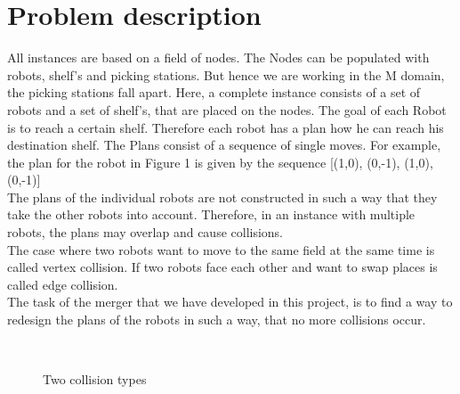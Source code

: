 \documentclass{llncs}
\begin{document}
\newpage

\section{Problem description}
All instances are based on a field of nodes. The Nodes can be populated with robots, shelf's and picking stations. But hence we are working in the M domain, the picking stations fall apart.
Here, a complete instance consists of a set of robots and a set of shelf's, that are placed on the nodes. The goal of each Robot is to reach a certain shelf. Therefore each robot has a plan how he can reach his destination shelf. The Plans consist of a sequence of single moves. For example, the plan for the robot in Figure 1 is given by the sequence [(1,0), (0,-1), (1,0), (0,-1)]\\
The plans of the individual robots are not constructed in such a way that they take the other robots into account. Therefore, in an instance with multiple robots, the plans may overlap and cause collisions.\\
The case where two robots want to move to the same field at the same time is called vertex collision. If two robots face each other and want to swap places is called edge collision.\\
The task of the merger that we have developed in this project, is to find a way to redesign the plans of the robots in such a way, that no more collisions occur.

\begin{figure}[!h]
  \centering
  \quad
  \\
  \caption{Two collision types}
  \label{fig2}
\end{figure}
\end{document}

